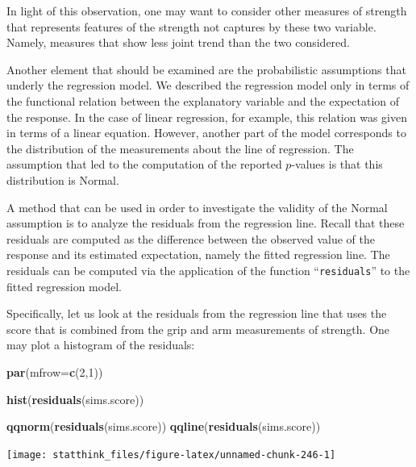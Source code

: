 \documentclass[]{krantz}
\makeatletter
\newenvironment{Shaded}{\begin{snugshade}}{\end{snugshade}}
\newcommand{\DataTypeTok}[1]{\textcolor[rgb]{0.13,0.29,0.53}{#1}}
\newcommand{\DecValTok}[1]{\textcolor[rgb]{0.00,0.00,0.81}{#1}}
\newcommand{\KeywordTok}[1]{\textcolor[rgb]{0.13,0.29,0.53}{\textbf{#1}}}
\newcommand{\NormalTok}[1]{#1}
\newenvironment{kframe}{%
\medskip{}
\setlength{\fboxsep}{.8em}
 \def\at@end@of@kframe{}%
 \ifinner\ifhmode%
  \def\at@end@of@kframe{\end{minipage}}%
  \begin{minipage}{\columnwidth}%
 \fi\fi%
 \def\FrameCommand##1{\hskip\@totalleftmargin \hskip-\fboxsep
 \colorbox{shadecolor}{##1}\hskip-\fboxsep
     \hskip-\linewidth \hskip-\@totalleftmargin \hskip\columnwidth}%
 \MakeFramed {\advance\hsize-\width
   \@totalleftmargin\z@ \linewidth\hsize
   \@setminipage}}%
 {\par\unskip\endMakeFramed%
 \at@end@of@kframe}
\renewenvironment{Shaded}{\begin{kframe}}{\end{kframe}}
\theoremstyle{definition}
\theoremstyle{definition}
\theoremstyle{definition}
\theoremstyle{remark}
\makeatother
\begin{document}
In light of this observation, one may want to consider other measures of
strength that represents features of the strength not captures by these
two variable. Namely, measures that show less joint trend than the two
considered.

Another element that should be examined are the probabilistic
assumptions that underly the regression model. We described the
regression model only in terms of the functional relation between the
explanatory variable and the expectation of the response. In the case of
linear regression, for example, this relation was given in terms of a
linear equation. However, another part of the model corresponds to the
distribution of the measurements about the line of regression. The
assumption that led to the computation of the reported \(p\)-values is
that this distribution is Normal.

A method that can be used in order to investigate the validity of the
Normal assumption is to analyze the residuals from the regression line.
Recall that these residuals are computed as the difference between the
observed value of the response and its estimated expectation, namely the
fitted regression line. The residuals can be computed via the
application of the function ``\texttt{residuals}'' to the fitted regression
model.

Specifically, let us look at the residuals from the regression line that
uses the score that is combined from the grip and arm measurements of
strength. One may plot a histogram of the residuals:

\begin{Shaded}
\begin{Highlighting}[]
\KeywordTok{par}\NormalTok{(}\DataTypeTok{mfrow=}\KeywordTok{c}\NormalTok{(}\DecValTok{2}\NormalTok{,}\DecValTok{1}\NormalTok{))}

\KeywordTok{hist}\NormalTok{(}\KeywordTok{residuals}\NormalTok{(sims.score))}

\KeywordTok{qqnorm}\NormalTok{(}\KeywordTok{residuals}\NormalTok{(sims.score))}
\KeywordTok{qqline}\NormalTok{(}\KeywordTok{residuals}\NormalTok{(sims.score))}
\end{Highlighting}
\end{Shaded}

\begin{center}\texttt{[image: statthink\_files/figure-latex/unnamed-chunk-246-1]} \end{center}
\end{document}
